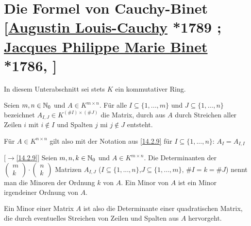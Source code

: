 \documentclass[../../main.tex]{subfiles}
\begin{document}
\section[Die Formel von Cauchy-Binet]{Die Formel von Cauchy-Binet\\{\small[\href{https://de.wikipedia.org/wiki/Augustin-Louis_Cauchy}{Augustin Louis-Cauchy} *1789 ; \href{https://en.wikipedia.org/wiki/Jacques_Philippe_Marie_Binet}{Jacques Philippe Marie Binet} *1786, ]}}

In diesem Unterabschnitt sei stets $K$ ein kommutativer Ring.

\begin{df}\label{17.2.1}
Seien $m,n\in \mathbb N_0$ und $A\in K^{m\times n}$. Für alle $I\subseteq\{1,...,m\}$ und $J\subseteq\{1,...,n\}$ bezeichnet $A_{I,J}\in K^{(\#I)\times (\#J)}$ die Matrix, durch aus $A$ durch Streichen aller Zeilen $i$ mit $i\notin I$ und Spalten $j$ mi $j\notin J$ entsteht.
\end{df}

\begin{bem}\label{17.2.2}
Für $A\in K^{n\times n}$ gilt also mit der Notation aus \ref{14.2.9} für $I\subseteq\{1,...,n\}$: $A_I=A_{I,I}$
\end{bem}

\begin{df}\mbox{}[$\to$\ref{14.2.9}]
\label{17.2.3}
Seien $m,n,k\in \mathbb N_0$ und $A\in K^{m\times n}$. Die Determinanten der $\begin{pmatrix*}m\\k\end{pmatrix*}\cdot\begin{pmatrix*}n\\k\end{pmatrix*}$ Matrizen $A_{I,J}$ ($I\subseteq\{1,...,n\}$,$J\subseteq\{1,...,m\}$, $\# I=k=\# J$) nennt man die Minoren der Ordnung $k$ von $A$. Ein Minor von  $A$ ist ein Minor irgendeiner Ordnung von $A$.
\end{df}

\begin{bem}\label{17.2.4}
Ein Minor einer Matrix $A$ ist also die Determinante einer quadratischen Matrix, die durch eventuelles Streichen von Zeilen und Spalten aus $A$ hervorgeht.
\end{bem}
\end{document}
